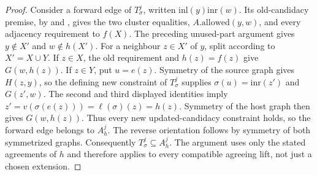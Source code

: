 \begin{proof}
Consider a forward edge of $T^j_\sigma$, written
$\mathrm{inl}(y)\mathrm{inr}(w)$. Its old-candidacy premise, by
 and , gives
the two cluster equalities, $A.\mathrm{allowed}(y,w)$, and every
adjacency requirement to $f(X)$. The preceding unused-part argument
gives $y\notin X'$ and $w\notin h(X')$.
For a neighbour $z\in X'$ of $y$, split according to $X'=X\cup Y$.
If $z\in X$, the old requirement and $h(z)=f(z)$ give
$G(w,h(z))$.
If $z\in Y$, put $u=e(z)$. Symmetry of the source graph gives
$H(z,y)$, so the defining new constraint of $T^j_\sigma$ supplies
$\sigma(u)=\mathrm{inr}(z')$ and $G(z',w)$.
The second and third displayed identities imply
$z'=v(\sigma(e(z)))=\ell(\sigma)(z)=h(z)$.
Symmetry of the host graph then gives $G(w,h(z))$.
Thus every new updated-candidacy constraint holds, so the forward edge
belongs to $A_h^j$. The reverse orientation follows by symmetry of
both symmetrized graphs. Consequently $T^j_\sigma\subseteq A_h^j$.
The argument uses only the stated agreements of $h$ and therefore
applies to every compatible agreeing lift, not just a chosen extension.
\end{proof}
